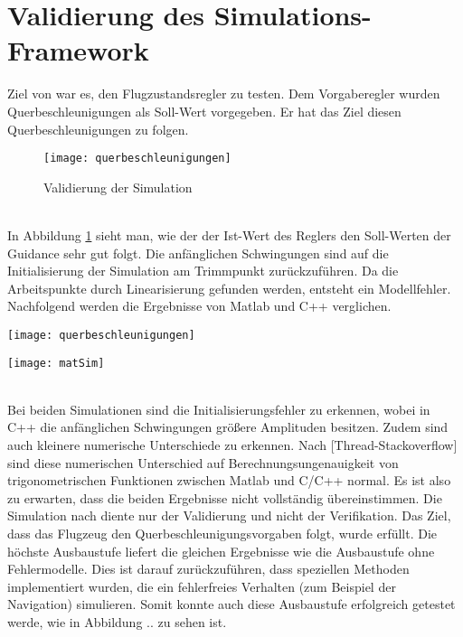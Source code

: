 \section{Validierung des Simulations-Framework}
Ziel von \cite{Olucak.15.02.2017} war es, den Flugzustandsregler zu testen. Dem Vorgaberegler wurden Querbeschleunigungen als Soll-Wert vorgegeben. Er hat das Ziel diesen Querbeschleunigungen zu folgen. 
\begin{figure}[h]
	\centering
	\texttt{[image: querbeschleunigungen]}
	\caption{Validierung der Simulation}
	\label{fig:valSim}
\end{figure}\noindent\\
 In Abbildung \ref{fig:valSim} sieht man, wie der der Ist-Wert des Reglers den Soll-Werten der Guidance  sehr gut folgt. Die anfänglichen Schwingungen sind auf die Initialisierung der Simulation am Trimmpunkt zurückzuführen. Da die Arbeitspunkte durch Linearisierung gefunden werden, entsteht ein Modellfehler. Nachfolgend werden die Ergebnisse von Matlab und C++ verglichen.
 \newpage
 \begin{minipage}{0.49\linewidth} 	
 		\texttt{[image: querbeschleunigungen]}
 \end{minipage}
 \begin{minipage}{0.01\linewidth}
	\hfill
\end{minipage}
 \begin{minipage}{0.49\linewidth}
		\texttt{[image: matSim]}
\end{minipage}
\noindent\\
Bei beiden Simulationen sind die Initialisierungsfehler zu erkennen, wobei in C++ die anfänglichen Schwingungen größere Amplituden besitzen. Zudem sind auch kleinere numerische Unterschiede zu erkennen. Nach [Thread-Stackoverflow] sind diese numerischen Unterschied auf Berechnungsungenauigkeit von trigonometrischen Funktionen zwischen Matlab und C/C++ normal. Es ist also zu erwarten, dass die beiden Ergebnisse nicht vollständig übereinstimmen. Die Simulation nach \cite{Olucak.15.02.2017} diente nur der Validierung und nicht der Verifikation. Das Ziel, dass das Flugzeug den Querbeschleunigungsvorgaben folgt, wurde erfüllt. Die höchste Ausbaustufe liefert die gleichen Ergebnisse wie die Ausbaustufe ohne Fehlermodelle. Dies ist darauf zurückzuführen, dass speziellen Methoden implementiert wurden, die ein fehlerfreies Verhalten (zum Beispiel der Navigation) simulieren. Somit konnte auch diese Ausbaustufe erfolgreich getestet werde, wie in Abbildung .. zu sehen ist.
\newpage
